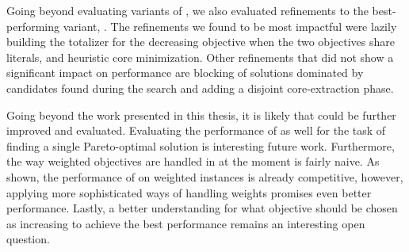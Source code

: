 Going beyond evaluating variants of \algname{}, we also evaluated refinements to the best-performing variant, \msh{}.
The refinements we found to be most impactful were lazily building the totalizer for the decreasing objective when the two objectives share literals, and heuristic core minimization.
Other refinements that did not show a significant impact on performance are blocking of solutions dominated by candidates found during the search and adding a disjoint core-extraction phase.

Going beyond the work presented in this thesis, it is likely that \algname{} could be further improved and evaluated.
Evaluating the performance of \algname{} as well for the task of finding a single Pareto-optimal solution is interesting future work.
Furthermore, the way weighted objectives are handled in \algname{} at the moment is fairly naive.
As shown, the performance of \algname{} on weighted instances is already competitive, however, applying more sophisticated ways of handling weights promises even better performance.
Lastly, a better understanding for what objective should be chosen as increasing to achieve the best performance remains an interesting open question.